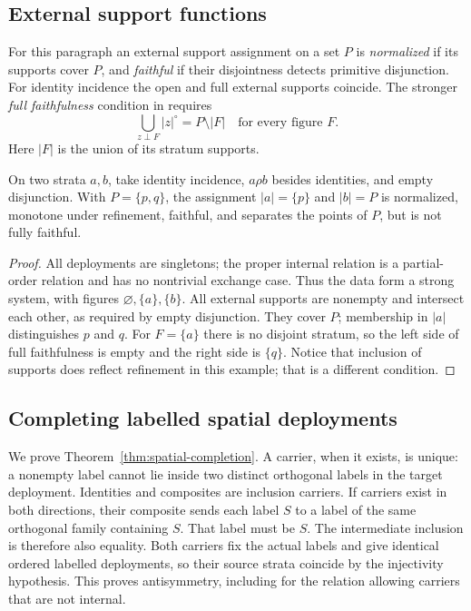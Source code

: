 \subsection{External support functions}
For this paragraph an external support assignment on a set $P$
is \emph{normalized} if its supports cover $P$, and \emph{faithful}
if their disjointness detects primitive disjunction. For identity
incidence the open and full external supports coincide. The
stronger \emph{full faithfulness} condition in
\cite[archive sheets~84--85, PDF pp.~85--86]{Groth8} requires
\[
 \bigcup_{z\perp F}|z|^\circ=P\setminus|F|
 \quad\text{for every figure }F.
\]
Here $|F|$ is the union of its stratum supports.

\begin{proposition}
\label{prop:external-faithful}
On two strata $a,b$, take identity incidence, $a\rho b$ besides
identities, and empty disjunction. With $P=\{p,q\}$, the assignment
$|a|=\{p\}$ and $|b|=P$ is normalized, monotone under refinement,
faithful, and separates the points of $P$, but is not fully faithful.
\end{proposition}
\begin{proof}
All deployments are singletons; the proper internal relation
is a partial-order relation and has no nontrivial exchange case.
Thus the data form a strong system, with figures
$\varnothing,\{a\},\{b\}$. All external supports are nonempty and
intersect each other, as required by empty disjunction. They cover
$P$; membership in $|a|$ distinguishes $p$ and $q$.
For $F=\{a\}$ there is no disjoint stratum, so the left side of
full faithfulness is empty and the right side is $\{q\}$.
Notice that inclusion of supports does reflect refinement in
this example; that is a different condition.
\end{proof}

\subsection{Completing labelled spatial deployments}
We prove Theorem~\ref{thm:spatial-completion}. A carrier, when it
exists, is unique: a nonempty label cannot lie inside two distinct
orthogonal labels in the target deployment. Identities and
composites are inclusion carriers. If carriers exist in both
directions, their composite sends each label $S$ to a label of
the same orthogonal family containing $S$. That label must be $S$.
The intermediate inclusion is therefore also equality. Both
carriers fix the actual labels and give identical ordered
labelled deployments, so their source strata coincide by the
injectivity hypothesis. This proves antisymmetry, including for
the relation allowing carriers that are not internal.

